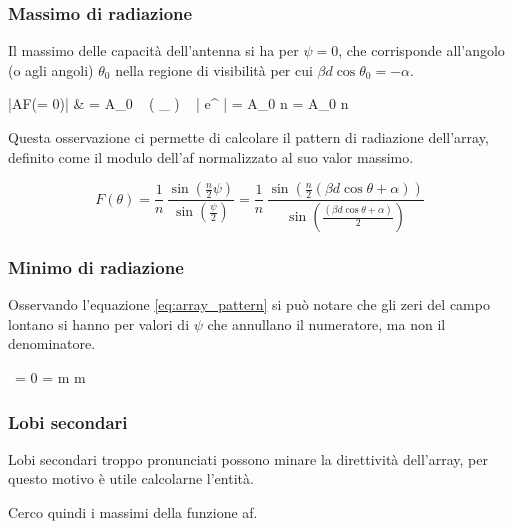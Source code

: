 		\subsubsection{Massimo di radiazione}
			Il massimo delle capacità dell'antenna si ha per $\psi = 0$, che corrisponde all'angolo (o agli angoli) $\theta_0$ nella regione di visibilità per cui $\beta d \cos \theta_0 = -\alpha$.

			\begin{esp}
				|AF(\psi = 0)|
					& = A_0
						~ \left( \lim_{\psi {}} \frac{ \sin(\frac{n}{2} \psi) }{ \sin(\frac{\psi}{2}) } \right)
						~ \left| e^{\jmath \frac{n-1}{2} \psi} \right|
						= A_0 \cdot n \cdot 1 = A_0 \cdot n
			\end{esp}

			Questa osservazione ci permette di calcolare il pattern di radiazione dell'array, definito come il modulo dell'\gls{af} normalizzato al suo valor massimo.

			\begin{equation} \label{eq:array_pattern}
				F(\theta)
					= \frac{1}{n} \, 
					= \frac{1}{n} \, \frac{
						\sin \left(
							\frac{n}{2} (\beta d \cos \theta + \alpha)
						\right)
					}{
						\sin \left(
							\frac{(\beta d \cos \theta + \alpha)}{2}
						\right)
					}
			\end{equation}

		\subsubsection{Minimo di radiazione}
			Osservando l'equazione \eqref{eq:array_pattern} si può notare che gli zeri del campo lontano si hanno per valori di $\psi$ che annullano il numeratore, ma non il denominatore.

			\begin{esp}
				 \, \frac{\sin(\frac{n}{2} \psi) }{ \sin( \frac{\psi}{2} ) } = 0
				\Leftrightarrow
					 \psi = \pm m \pi \quad \forall m \neq 0
			\end{esp}

		\subsubsection{Lobi secondari}
			Lobi secondari troppo pronunciati possono minare la direttività dell'array, per questo motivo è utile calcolarne l'entità.

			Cerco quindi i massimi della funzione \gls{af}.

